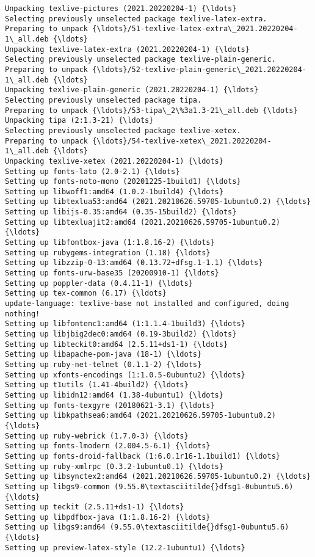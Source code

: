 \documentclass[11pt]{article}
\begin{document}
\begin{Verbatim}[commandchars=\\\{\}]
Unpacking texlive-pictures (2021.20220204-1) {\ldots}
Selecting previously unselected package texlive-latex-extra.
Preparing to unpack {\ldots}/51-texlive-latex-extra\_2021.20220204-1\_all.deb {\ldots}
Unpacking texlive-latex-extra (2021.20220204-1) {\ldots}
Selecting previously unselected package texlive-plain-generic.
Preparing to unpack {\ldots}/52-texlive-plain-generic\_2021.20220204-1\_all.deb {\ldots}
Unpacking texlive-plain-generic (2021.20220204-1) {\ldots}
Selecting previously unselected package tipa.
Preparing to unpack {\ldots}/53-tipa\_2\%3a1.3-21\_all.deb {\ldots}
Unpacking tipa (2:1.3-21) {\ldots}
Selecting previously unselected package texlive-xetex.
Preparing to unpack {\ldots}/54-texlive-xetex\_2021.20220204-1\_all.deb {\ldots}
Unpacking texlive-xetex (2021.20220204-1) {\ldots}
Setting up fonts-lato (2.0-2.1) {\ldots}
Setting up fonts-noto-mono (20201225-1build1) {\ldots}
Setting up libwoff1:amd64 (1.0.2-1build4) {\ldots}
Setting up libtexlua53:amd64 (2021.20210626.59705-1ubuntu0.2) {\ldots}
Setting up libijs-0.35:amd64 (0.35-15build2) {\ldots}
Setting up libtexluajit2:amd64 (2021.20210626.59705-1ubuntu0.2) {\ldots}
Setting up libfontbox-java (1:1.8.16-2) {\ldots}
Setting up rubygems-integration (1.18) {\ldots}
Setting up libzzip-0-13:amd64 (0.13.72+dfsg.1-1.1) {\ldots}
Setting up fonts-urw-base35 (20200910-1) {\ldots}
Setting up poppler-data (0.4.11-1) {\ldots}
Setting up tex-common (6.17) {\ldots}
update-language: texlive-base not installed and configured, doing nothing!
Setting up libfontenc1:amd64 (1:1.1.4-1build3) {\ldots}
Setting up libjbig2dec0:amd64 (0.19-3build2) {\ldots}
Setting up libteckit0:amd64 (2.5.11+ds1-1) {\ldots}
Setting up libapache-pom-java (18-1) {\ldots}
Setting up ruby-net-telnet (0.1.1-2) {\ldots}
Setting up xfonts-encodings (1:1.0.5-0ubuntu2) {\ldots}
Setting up t1utils (1.41-4build2) {\ldots}
Setting up libidn12:amd64 (1.38-4ubuntu1) {\ldots}
Setting up fonts-texgyre (20180621-3.1) {\ldots}
Setting up libkpathsea6:amd64 (2021.20210626.59705-1ubuntu0.2) {\ldots}
Setting up ruby-webrick (1.7.0-3) {\ldots}
Setting up fonts-lmodern (2.004.5-6.1) {\ldots}
Setting up fonts-droid-fallback (1:6.0.1r16-1.1build1) {\ldots}
Setting up ruby-xmlrpc (0.3.2-1ubuntu0.1) {\ldots}
Setting up libsynctex2:amd64 (2021.20210626.59705-1ubuntu0.2) {\ldots}
Setting up libgs9-common (9.55.0\textasciitilde{}dfsg1-0ubuntu5.6) {\ldots}
Setting up teckit (2.5.11+ds1-1) {\ldots}
Setting up libpdfbox-java (1:1.8.16-2) {\ldots}
Setting up libgs9:amd64 (9.55.0\textasciitilde{}dfsg1-0ubuntu5.6) {\ldots}
Setting up preview-latex-style (12.2-1ubuntu1) {\ldots}

\end{Verbatim}
\end{document}
